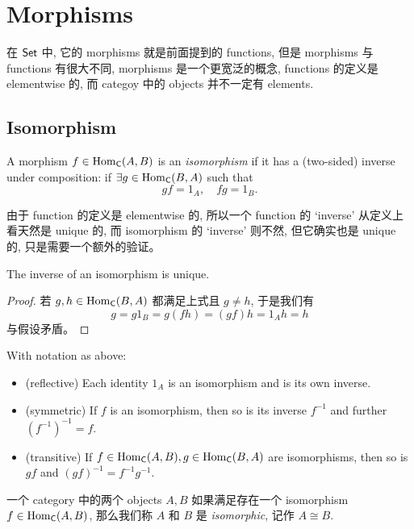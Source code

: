 \section{Morphisms}\label{sec:1.4}

在 \(\operatorname{\mathsf{Set}}\) 中, 它的 morphisms 就是前面提到的 functions, 但是 morphisms 与 functions 有很大不同, morphisms 是一个更宽泛的概念, functions 的定义是 elementwise 的, 而 categoy 中的 objects 并不一定有 elements.

\subsection{Isomorphism}\label{sec:1.4.1}

\begin{definition}[Isomorphism]\label{def:isomorphism}
    A morphism \(f \in \operatorname{Hom}_{\operatorname{\mathsf{C}}}(A, B)\) is an \emph{isomorphism} if it has a (two-sided) inverse under composition: if \(\exists g \in \operatorname{Hom}_{\operatorname{\mathsf{C}}}(B, A)\) such that
    \[
        gf = 1_A, \quad fg = 1_B.
    \]
\end{definition}

由于 function 的定义是 elementwise 的, 所以一个 function 的 `inverse' 从定义上看天然是 unique 的, 而 isomorphism 的 `inverse' 则不然, 但它确实也是 unique 的, 只是需要一个额外的验证。

\begin{proposition}\label{prop:1.4.2}
    The inverse of an isomorphism is unique.
\end{proposition}
\begin{proof}
    若 \(g, h \in \operatorname{Hom}_{\operatorname{\mathsf{C}}}(B, A)\) 都满足上式且 \(g \not= h\), 于是我们有
    \[g = g 1_{B} = g(fh) = (gf)h = 1_{A} h = h\]
    与假设矛盾。
\end{proof}

\begin{proposition}\label{prop:1.4.3}
    With notation as above:
    \begin{itemize}
        \item (reflective) Each identity \(1_A\) is an isomorphism and is its own inverse.
        \item (symmetric) If \(f\) is an isomorphism, then so is its inverse \(f^{-1}\) and further \((f^{-1})^{-1} = f\).
        \item (transitive) If \(f\in \operatorname{Hom}_{\operatorname{\mathsf{C}}}(A, B), g \in \operatorname{Hom}_{\operatorname{\mathsf{C}}}(B, A)\) are isomorphisms, then so is \(gf\) and \((gf)^{-1} = f^{-1}g^{-1}\).
    \end{itemize}
\end{proposition}
\begin{note}
    一个 category 中的两个 objects \(A, B\) 如果满足存在一个 isomorphism \(f \in \operatorname{Hom}_{\operatorname{\mathsf{C}}}(A, B)\), 那么我们称 \(A\) 和 \(B\) 是 \emph{isomorphic}, 记作 \(A \cong B\).
\end{note}


